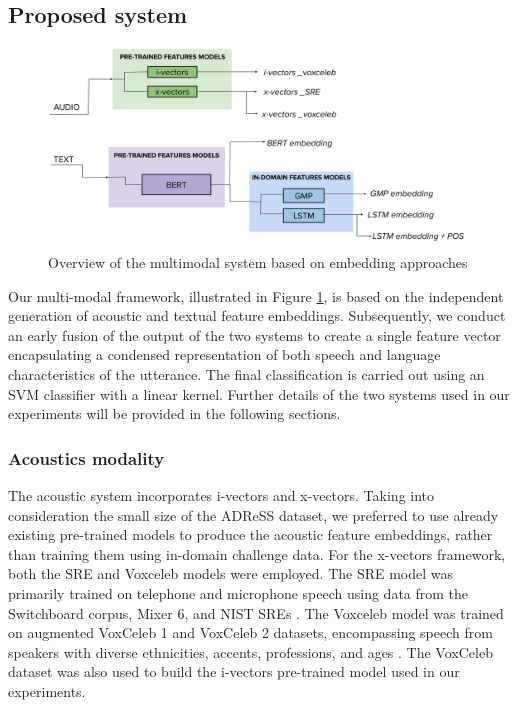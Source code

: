 \subsection{Proposed system}
\begin{figure}[h]
  \begin{center}
  \includegraphics[scale=0.35]{imgs/ADReSS.png}  
  \caption{Overview of the multimodal system based on embedding approaches}
  \label{fig:adress_overview}
  \end{center}
\end{figure}
Our multi-modal framework, illustrated in Figure \ref{fig:adress_overview}, is based on the independent generation of acoustic and textual feature embeddings. Subsequently, we conduct an early fusion of the output of the two systems to create a single feature vector encapsulating a condensed representation of both speech and language characteristics of the utterance. The final classification is carried out using an \ac{SVM} classifier with a linear kernel. Further details of the two systems used in our experiments will be provided in the following sections.
\subsubsection{Acoustics modality}
The acoustic system incorporates i-vectors and x-vectors. Taking into consideration the small size of the ADReSS dataset, we preferred to use already existing pre-trained models to produce the acoustic feature embeddings, rather than training them using in-domain challenge data. For the x-vectors framework, both the SRE and Voxceleb models were employed. The SRE model was primarily trained on telephone and microphone speech using data from the Switchboard corpus, Mixer 6, and NIST SREs \cite{snyder2018x}. The Voxceleb model was trained on augmented VoxCeleb 1 and VoxCeleb 2 datasets, encompassing speech from speakers with diverse ethnicities, accents, professions, and ages \cite{snyder2018x,nagrani17_interspeech}. The VoxCeleb dataset was also used to build the i-vectors pre-trained model used in our experiments.

